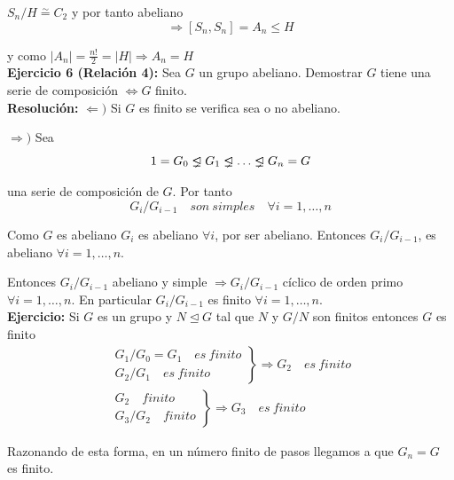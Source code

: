 \documentclass{article}
\newcommand{\unlhdneq}{%
  \mathrel{\ooalign{$\lneq$\cr\raise.22ex\hbox{$\lhd$}\cr}}}
\begin{document}
$S_n/H\overset{\sim}{=} C_2$ y por tanto abeliano
\begin{equation*}
\Rightarrow \left[S_n,S_n\right]=A_n\leq H
\end{equation*}

y como $|A_n|=\frac{n!}{2}=|H| \Rightarrow A_n=H$ \\

\textbf{Ejercicio 6 (Relación 4):} Sea $G$ un grupo abeliano. Demostrar $G$ tiene una serie de composición $\Leftrightarrow G$ finito. \\

\textbf{Resolución:} $\Leftarrow)$ Si $G$ es finito se verifica sea o no abeliano. 

$\Rightarrow)$ Sea
\begin{equation*}
1=G_0\unlhdneq G_1\unlhdneq \ldots\unlhdneq G_n=G
\end{equation*}

una serie de composición de $G$. Por tanto
\begin{equation*}
G_i/G_{i-1} \quad son\:simples \quad \forall i=1,\ldots,n
\end{equation*}

Como $G$ es abeliano $G_i$ es abeliano $\forall i$, por ser abeliano. Entonces $G_i/G_{i-1}$, es abeliano $\forall i=1,\ldots,n$.

Entonces $G_i/G_{i-1}$ abeliano y simple $\Rightarrow G_i/G_{i-1}$ cíclico de orden primo $\forall i=1,\ldots,n$. En particular $G_i/G_{i-1}$ es finito $\forall i=1,\ldots,n$. \\

\textbf{Ejercicio:} Si $G$ es un grupo y $N\unlhd G$ tal que $N$ y $G/N$ son finitos entonces $G$ es finito
\begin{gather*}
\left. \begin{array}{c}
G_1/G_0=G_1\quad es\:finito\\
G_2/G_1 \quad es\:finito
\end{array} \right\rbrace \Rightarrow G_2\quad es\:finito\\
\left. \begin{array}{c}
G_2\quad finito\\
G_3/G_2\quad finito
\end{array} \right\rbrace \Rightarrow G_3\quad es\:finito
\end{gather*}

Razonando de esta forma, en un número finito de pasos llegamos a que $G_n=G$ es finito. \\
\end{document}
